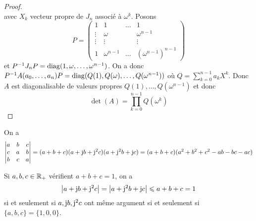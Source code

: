 \documentclass[12pt]{article}
\begin{document}
\begin{proof}
\begin{equation}
	\end{equation}
	avec $X_{k}$ vecteur propre de $J_{n}$ associé à $\omega^{k}$. Posons 
	\begin{equation}
		P=
		\begin{pmatrix}
			1&1&\dots&1\\
			\vdots&\omega&&\omega^{n-1}\\
			\vdots&\vdots&&\vdots\\
			1&\omega^{n-1}&\dots&(\omega^{n-1})^{n-1}
		\end{pmatrix}
	\end{equation}
	et $P^{-1}J_{n}P=\operatorname{diag}(1,\omega,\dots,\omega^{n-1})$. On a donc $P^{-1}A(a_{0},\dots,a_{n})P=\operatorname{diag}(Q(1),Q(\omega),\dots,Q(\omega^{n-1}))$ où $Q=\sum_{k=0}^{n-1}a_{k}X^{k}$.
	Donc $A$ est diagonalisable de valeurs propres $Q(1),\dots,Q(\omega^{n-1})$ et donc
	\begin{equation}
		\boxed{\det(A)=\prod_{k=0}^{n-1}Q(\omega^{k})}
	\end{equation}
\end{proof}

\begin{remark}
	On a 
	\begin{equation}
		\begin{vmatrix}
			a&b&c\\
			c&a&b\\
			b&c&a
		\end{vmatrix}=(a+b+c)(a+\mathrm{j} b+\mathrm{j}^{2}c)(a+\mathrm{j}^{2}b+\mathrm{j} c)=(a+b+c)(a^{2}+b^{2}+c^{2}-ab-bc-ac)
	\end{equation}

	Si $a,b,c\in\mathbb{R}_{+}$ vérifient $a+b+c=1$, on a 
	\begin{equation}
		\left\lvert a+\mathrm{j} b+\mathrm{j}^{2}c\right\rvert=\left\lvert a+\mathrm{j}^{2}b+\mathrm{j} c\right\rvert\leqslant a+b+c=1
	\end{equation}
	si et seulement si $a,\mathrm{j} b,\mathrm{j}^{2}c$ ont même argument si et seulement si $\lbrace a,b,c\rbrace=\lbrace1,0,0\rbrace$.
\end{remark}
\end{document}
